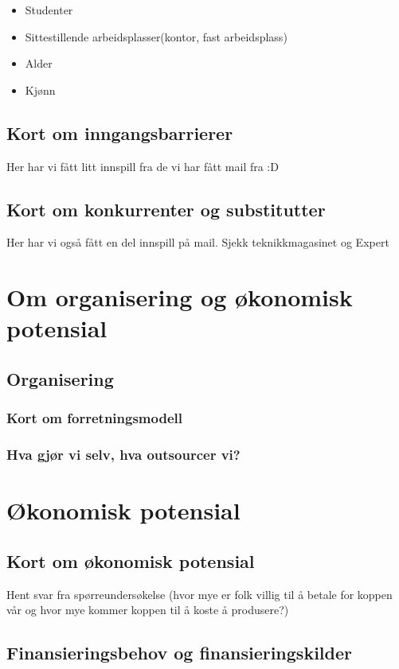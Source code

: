 \begin{itemize}
	\item Studenter
	\item Sittestillende arbeidsplasser(kontor, fast arbeidsplass)
	\item Alder
	\item Kjønn
\end{itemize}

\subsection{Kort om inngangsbarrierer}
Her har vi fått litt innspill fra de vi har fått mail fra :D
\subsection{Kort om konkurrenter og substitutter}
Her har vi også fått en del innspill på mail. Sjekk teknikkmagasinet og Expert

\section{Om organisering og økonomisk potensial}

\subsection{Organisering}

\subsubsection{Kort om forretningsmodell}

\subsubsection{Hva gjør vi selv, hva outsourcer vi?}

\section{Økonomisk potensial}

\subsection{Kort om økonomisk potensial}
Hent svar fra spørreundersøkelse (hvor mye er folk villig til å betale for koppen vår og hvor mye kommer koppen til å koste å produsere?)
\subsection{Finansieringsbehov og finansieringskilder}
